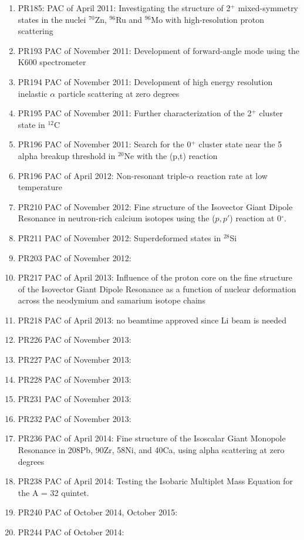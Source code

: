 \documentclass[11pt]{report}
\begin{document}
\begin{enumerate}
\item PR185: PAC of April 2011:   Investigating the structure of 2$^+$ mixed-symmetry states in the nuclei $^{70}$Zn,    
	     $^{96}$Ru and $^{96}$Mo with high-resolution proton scattering
\item PR193  PAC of November 2011: Development of forward-angle mode using the K600 spectrometer
\item PR194  PAC of November 2011: Development of high energy resolution inelastic $\alpha$ particle scattering at zero degrees	
\item PR195  PAC of November 2011: Further characterization of the 2$^+$ cluster state in $^{12}$C
\item PR196  PAC of November 2011: Search for the 0$^+$ cluster state near the 5 alpha breakup threshold in $^{20}$Ne with the (p,t) reaction
\item PR196  PAC of April 2012: Non-resonant triple-$\alpha$ reaction rate at low temperature
\item PR210  PAC of November 2012: Fine structure of the Isovector Giant Dipole Resonance in neutron-rich calcium isotopes using the ($p,p'$) reaction at 0$^{\circ}$.
\item PR211  PAC of November 2012: Superdeformed states in $^{28}$Si 
\item PR203  PAC of November 2012:
\item PR217  PAC of April 2013: Influence of the proton core on the ﬁne structure of the Isovector
Giant Dipole Resonance as a function of nuclear deformation across the neodymium and samarium isotope chains
\item PR218  PAC of April 2013: no beamtime approved since Li beam is needed
\item PR226  PAC of November 2013: 
\item PR227  PAC of November 2013: 
\item PR228  PAC of November 2013:
\item PR231  PAC of November 2013: 
\item PR232  PAC of November 2013:
\item PR236  PAC of April 2014:   Fine structure of the Isoscalar Giant Monopole Resonance in 
208Pb, 90Zr, 58Ni, and 40Ca, using alpha scattering at zero degrees
\item PR238  PAC of April 2014:  Testing the Isobaric Multiplet Mass Equation for the A = 32 quintet.
\item PR240  PAC of October 2014, October 2015:
\item PR244  PAC of October 2014:

\end{enumerate}
\end{document}
